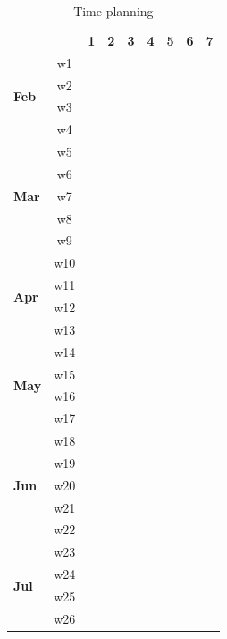 \begin{table}[h]
  \begin{center}
    \addtolength{\tabcolsep}{4pt} %
    \renewcommand{\arraystretch}{0.8} %
      \begin{tabular}{ l c c c c c c c c }
        && \textbf{1} & \textbf{2} & \textbf{3} & \textbf{4} & \textbf{5} & \textbf{6} & \textbf{7} \\ 
        \multirow{4}{*}{\textbf{Feb}} & w1 & \cellcolor[rgb]{0.94,0.96,0.98} \\ & w2 & \cellcolor[rgb]{0.94,0.96,0.98} \\ & w3 && \cellcolor[rgb]{0.86,0.90,0.96} \\ & w4 && \cellcolor[rgb]{0.86,0.90,0.96} \\ 
        \multirow{5}{*}{\textbf{Mar}} & w5 && \cellcolor[rgb]{0.86,0.90,0.96} \\ & w6 &&& \cellcolor[rgb]{0.78,0.84,0.94} \\ & w7 &&& \cellcolor[rgb]{0.78,0.84,0.94} \\ & w8 &&& \cellcolor[rgb]{0.78,0.84,0.94} \\ & w9 &&& \cellcolor[rgb]{0.78,0.84,0.94} \\ 
        \multirow{4}{*}{\textbf{Apr}} & w10 &&&& \cellcolor[rgb]{0.71,0.78,0.92} \\ & w11 &&&& \cellcolor[rgb]{0.71,0.78,0.92} \\ & w12 &&&& \cellcolor[rgb]{0.71,0.78,0.92} \\ & w13 &&&& \cellcolor[rgb]{0.71,0.78,0.92} \\ 
        \multirow{4}{*}{\textbf{May}} & w14 &&&&& \cellcolor[rgb]{0.63,0.73,0.89} \\ & w15 &&&&& \cellcolor[rgb]{0.63,0.73,0.89} \\ & w16 &&&&& \cellcolor[rgb]{0.63,0.73,0.89} \\ & w17 &&&&& \cellcolor[rgb]{0.63,0.73,0.89} \\ 
        \multirow{5}{*}{\textbf{Jun}} & w18 &&&&& \cellcolor[rgb]{0.63,0.73,0.89} \\ & w19 &&&&& \cellcolor[rgb]{0.63,0.73,0.89} \\ & w20 &&&&&& \cellcolor[rgb]{0.55,0.67,0.87} \\ & w21 &&&&&& \cellcolor[rgb]{0.55,0.67,0.87} \\ & w22 &&&&&& \cellcolor[rgb]{0.55,0.67,0.87} \\ 
        \multirow{4}{*}{\textbf{Jul}} & w23 &&&&&& \cellcolor[rgb]{0.55,0.67,0.87} \\ & w24 &&&&&&& \cellcolor[rgb]{0.47,0.61,0.85} \\ & w25 &&&&&&& \cellcolor[rgb]{0.47,0.61,0.85} \\ & w26 &&&&&&& \cellcolor[rgb]{0.47,0.61,0.85} \\ 
      \end{tabular}
    \caption{Time planning}
    \label{tab:planning}
  \end{center}
\end{table}